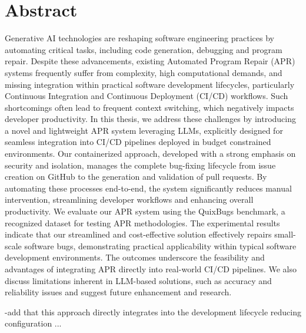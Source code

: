 \thispagestyle{empty}       %

\section*{Abstract}
Generative AI technologies are reshaping software engineering practices by automating critical tasks, including code generation, debugging and program repair. Despite these advancements, existing Automated Program Repair (APR) systems frequently suffer from complexity, high computational demands, and missing integration within practical software development lifecycles, particularly Continuous Integration and Continuous Deployment (CI/CD) workflows. Such shortcomings often lead to frequent context switching, which negatively impacts developer productivity. \break
In this thesis, we address these challenges by introducing a novel and lightweight APR system leveraging LLMs, explicitly designed for seamless integration into CI/CD pipelines deployed in budget constrained environments. Our containerized approach, developed with a strong emphasis on security and isolation, manages the complete bug-fixing lifecycle from issue creation on GitHub to the generation and validation of pull requests. By automating these processes end-to-end, the system significantly reduces manual intervention, streamlining developer workflows and enhancing overall productivity.\break
We evaluate our APR system using the QuixBugs benchmark, a recognized dataset for testing APR methodologies. The experimental results indicate that our streamlined and cost-effective solution effectively repairs small-scale software bugs, demonstrating practical applicability within typical software development environments. \break
The outcomes underscore the feasibility and advantages of integrating APR directly into real-world CI/CD pipelines. We also discuss limitations inherent in LLM-based solutions, such as accuracy and reliability issues and suggest future enhancement and research.


-add that this approach directly integrates into the development lifecycle reducing configuration ...